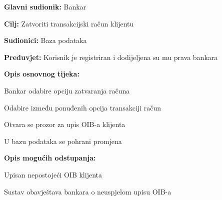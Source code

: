 \noindent {}
\begin{packed_item}

  \item \textbf{Glavni sudionik: }Bankar
  \item  \textbf{Cilj:} Zatvoriti transakcijski račun klijentu
  \item  \textbf{Sudionici:} Baza podataka
  \item  \textbf{Preduvjet:} Korisnik je registriran i dodijeljena su mu prava bankara
  \item  \textbf{Opis osnovnog tijeka:}
  
  \item[] \begin{packed_enum}

    \item Bankar odabire opciju zatvaranja računa
    \item Odabire između  ponuđenih opcija transakciji račun 
    \item Otvara se prozor za upis OIB-a klijenta 
    \item U bazu podataka se pohrani promjena
  \end{packed_enum}
  
  \item  \textbf{Opis mogućih odstupanja:}
  
  \item[] \begin{packed_item}

    \item[3.a] Upisan nepostojeći OIB klijenta
    \item[] \begin{packed_enum}
      
      \item Sustav obavještava bankara o neuspjelom upisu OIB-a 
      
    \end{packed_enum}
    
  \end{packed_item}
\end{packed_item}


